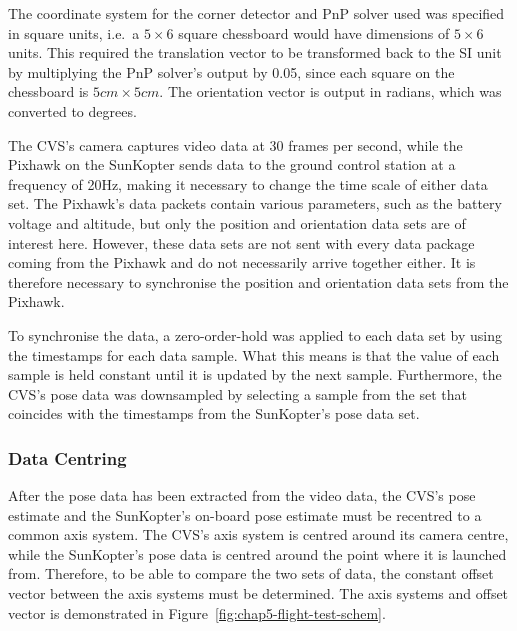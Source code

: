 The coordinate system for the corner detector and PnP solver used was specified in square units, i.e.\ a $5\times6$ square chessboard would have dimensions of $5\times6$ units. This required the translation vector to be transformed back to the SI unit by multiplying the PnP solver's output by 0.05, since each square on the chessboard is $5cm\times5cm$. The orientation vector is output in radians, which was converted to degrees. 

The CVS's camera captures video data at 30 frames per second, while the Pixhawk on the SunKopter sends data to the ground control station at a frequency of 20Hz, making it necessary to change the time scale of either data set. The Pixhawk's data packets contain various parameters, such as the battery voltage and altitude, but only the position and orientation data sets are of interest here. However, these data sets are not sent with every data package coming from the Pixhawk and do not necessarily arrive together either. It is therefore necessary to synchronise the position and orientation data sets from the Pixhawk.

To synchronise the data, a zero-order-hold was applied to each data set by using the timestamps for each data sample. What this means is that the value of each sample is held constant until it is updated by the next sample. Furthermore, the CVS's pose data was downsampled by selecting a sample from the set that coincides with the timestamps from the SunKopter's pose data set. 

\subsubsection{Data Centring}
\label{sec:chap5-data-centring}

After the pose data has been extracted from the video data, the CVS's pose estimate and the SunKopter's on-board pose estimate must be recentred to a common axis system. The CVS's axis system is centred around its camera centre, while the SunKopter's pose data is centred around the point where it is launched from. Therefore, to be able to compare the two sets of data, the constant offset vector between the axis systems must be determined. The axis systems and offset vector is demonstrated in Figure~\ref{fig:chap5-flight-test-schem}.

